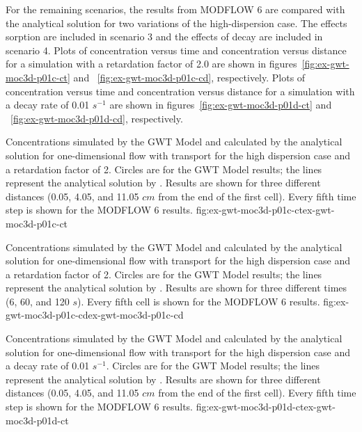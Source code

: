 For the remaining scenarios, the results from MODFLOW 6 are compared with the \cite{wexler1992} analytical solution for two variations of the high-dispersion case.  The effects sorption are included in scenario 3 and the effects of decay are included in scenario 4.  Plots of concentration versus time and concentration versus distance for a simulation with a retardation factor of 2.0 are shown in figures~\ref{fig:ex-gwt-moc3d-p01c-ct} and ~\ref{fig:ex-gwt-moc3d-p01c-cd}, respectively.  Plots of concentration versus time and concentration versus distance for a simulation with a decay rate of 0.01 $s^{-1}$ are shown in figures~\ref{fig:ex-gwt-moc3d-p01d-ct} and ~\ref{fig:ex-gwt-moc3d-p01d-cd}, respectively.

\begin{StandardFigure}{
                                     Concentrations simulated by the \mf GWT Model and calculated by the analytical solution for one-dimensional flow with transport for the high dispersion case and a retardation factor of 2.  Circles are for the GWT Model results; the lines represent the analytical solution by \cite{wexler1992}.  Results are shown for three different distances (0.05, 4.05, and 11.05 $cm$ from the end of the first cell).  Every fifth time step is shown for the MODFLOW 6 results.
                                     }{fig:ex-gwt-moc3d-p01c-ct}{ex-gwt-moc3d-p01c-ct}
\end{StandardFigure}            

\begin{StandardFigure}{
                                     Concentrations simulated by the \mf GWT Model and calculated by the analytical solution for one-dimensional flow with transport for the high dispersion case and a retardation factor of 2.  Circles are for the GWT Model results; the lines represent the analytical solution by \cite{wexler1992}.  Results are shown for three different times (6, 60, and 120 $s$).  Every fifth cell is shown for the MODFLOW 6 results.
                                     }{fig:ex-gwt-moc3d-p01c-cd}{ex-gwt-moc3d-p01c-cd}
\end{StandardFigure}            

\begin{StandardFigure}{
                                     Concentrations simulated by the \mf GWT Model and calculated by the analytical solution for one-dimensional flow with transport for the high dispersion case and a decay rate of 0.01 $s^{-1}$.  Circles are for the GWT Model results; the lines represent the analytical solution by \cite{wexler1992}.  Results are shown for three different distances (0.05, 4.05, and 11.05 $cm$ from the end of the first cell).  Every fifth time step is shown for the MODFLOW 6 results.
                                     }{fig:ex-gwt-moc3d-p01d-ct}{ex-gwt-moc3d-p01d-ct}
\end{StandardFigure}            

